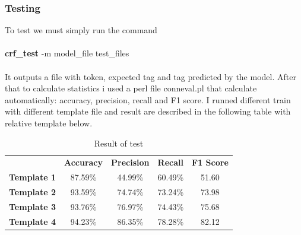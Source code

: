 \documentclass[a4paper,8pt,oneside]{article}
\begin{document}
		\subsubsection{Testing}
			To test we must simply run the command \\ \\
			\textbf{crf\_test} -m model\_file test\_files \\ \\
			It outputs a file with token, expected tag and tag predicted by the model. After that to calculate statistics i used a perl file conneval.pl that calculate automatically: accuracy, precision, recall and F1 score. I runned different train with different template file and result are described in the following table with relative template below.
			\begin{table}[h]
				\centering
				\begin{tabular}{ccccc}
					& \textbf{Accuracy} & \textbf{Precision} & \textbf{Recall}  & \textbf{F1 Score} \\
					\textbf{Template 1} & 87.59\%  & 44.99\%   & 60.49\% & 51.60    \\
					\textbf{Template 2} & 93.59\%  & 74.74\%   & 73.24\% & 73.98     \\
					\textbf{Template 3} & 93.76\%  & 76.97\%   & 74.43\% & 75.68    \\
					\textbf{Template 4} & 94.23\%  & 86.35\%   & 78.28\% & 82.12    \\
				\end{tabular}
				\caption{Result of test}

			\end{table}
\end{document}
